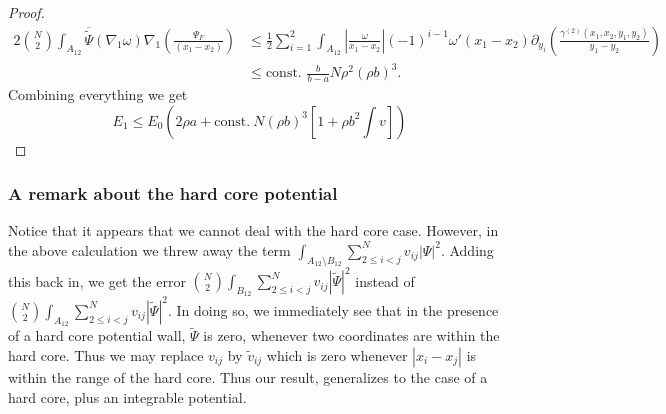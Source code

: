 \documentclass[a4paper,11pt]{article}
\newcommand{\abs}[1]{\left\lvert #1 \right\rvert}
\numberwithin{equation}{section}
\begin{document}
\begin{proof}
\begin{equation}
\begin{aligned}
		2\binom{N}{2}\int_{A_{12}}\overline{\tilde{\Psi}}(\nabla_1\omega)\nabla_1\left(\frac{\Psi_F}{(x_1-x_2)}\right)&\leq\frac12\sum_{i=1}^{2}\int_{A_{12}}\abs{\frac{\omega}{x_1-x_2}}(-1)^{i-1}\omega'(x_1-x_2)\partial_{y_i}\left(\frac{\gamma^{(2)}(x_1,x_2,y_1,y_2)}{y_1-y_2}\right)\\
		&\leq \text{const. }\frac{b}{b-a}N\rho^2(\rho b)^3.
		\end{aligned}
		\end{equation}
		Combining everything we get \begin{equation}
		E_1\leq E_0 \left(2\rho a+ \text{const.}\ N(\rho b)^3\left[ 1+ \rho b^2\int v\right]\right)
		\end{equation}
	\end{proof}
		\subsubsection{A remark about the hard core potential}
		Notice that it appears that we cannot deal with the hard core case. However, in the above calculation we threw away the term $ \int_{A_{12}\setminus B_{12}} \sum_{2\leq i<j}^{N}v_{ij}\abs{\Psi}^2 $. Adding this back in, we get the error $ \binom{N}{2}\int_{B_{12}} \sum_{2\leq i<j}^{N}v_{ij}\abs{\tilde{\Psi}}^2 $ instead of $ \binom{N}{2}\int_{A_{12}} \sum_{2\leq i<j}^{N}v_{ij}\abs{\tilde{\Psi}}^2 $. In doing so, we immediately see that in the presence of a hard core potential wall, $ \tilde{\Psi} $ is zero, whenever two coordinates are within the hard core. Thus we may replace $ v_{ij} $ by $ \tilde{v}_{ij} $ which is zero whenever $ \abs{x_i-x_j} $ is within the range of the hard core. Thus our result, generalizes to the case of a hard core, plus an integrable potential.
\end{document}
